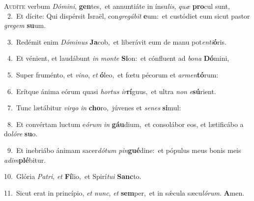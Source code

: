 \lettrine{\initial\textcolor{\initialcolor}{A}}{udíte} verbum \textit{Dó}\-\textit{mi}\textit{ni}, \textbf{gen}\-tes,~\star et annuntiáte in ínsu\-\textit{lis}\-, \textit{quæ} \textbf{pro}\-cul sunt,\\
{\numbfont\textcolor{\numbcolor}{~2.}}~Et dícite: Qui dispérsit Israël, con\-\textit{gre}\-\textit{gá}\textit{bit} \textbf{e}\-um:~\star et custódiet eum sicut pastor \textit{gre}\-\textit{gem} \textbf{su}\-um.\par
{\numbfont\textcolor{\numbcolor}{~3.}}~Redémit enim \textit{Dó}\-\textit{mi}\textit{nus} \textbf{Ja}\-cob,~\star et liberávit eum de manu pot\-\textit{en}\-\textit{ti}\textbf{ó}ris.\par
{\numbfont\textcolor{\numbcolor}{~4.}}~Et vénient, et laudábunt \textit{in} \textit{mon}\-\textit{te} \textbf{Si}\-on:~\star et cónfluent ad \textit{bo}\-\textit{na} \textbf{Dó}\-mini,\par
{\numbfont\textcolor{\numbcolor}{~5.}}~Super fruménto, et \textit{vi}\-\textit{no}, \textit{et} \textbf{ó}\-leo,~\star et fœtu pécorum et \textit{ar}\-\textit{men}\textbf{tó}rum:\par
{\numbfont\textcolor{\numbcolor}{~6.}}~Erítque ánima eórum quasi \textit{hor}\-\textit{tus} \textit{ir}\-\textbf{rí}guus,~\star et ultra \textit{non} \textit{e}\-\textbf{sú}rient.\par
{\numbfont\textcolor{\numbcolor}{~7.}}~Tunc lætábitur \textit{vir}\-\textit{go} \textit{in} \textbf{cho}\-ro,~\star júvenes et \textit{se}\-\textit{nes} \textbf{si}\-mul:\par
{\numbfont\textcolor{\numbcolor}{~8.}}~Et convértam luctum e\-\textit{ó}\-\textit{rum} \textit{in} \textbf{gáu}\-dium,~\star et consolábor eos, et lætificábo a do\-\textit{ló}\-\textit{re} \textbf{su}\-o.\par
{\numbfont\textcolor{\numbcolor}{~9.}}~Et inebriábo ánimam sacer\-\textit{dó}\-\textit{tum} \textit{pin}\-\textbf{gué}dine:~\star et pópulus meus bonis meis \textit{ad}\-\textit{im}\textbf{plé}bitur.\par
{\numbfont\textcolor{\numbcolor}{10.}}~Glória \textit{Pa}\-\textit{tri}, \textit{et} \textbf{Fí}\-lio,~\star et Spirí\-\textit{tu}\-\textit{i} \textbf{Sanc}\-to.\par
{\numbfont\textcolor{\numbcolor}{11.}}~Sicut erat in princípio, \textit{et} \textit{nunc}\-, \textit{et} \textbf{sem}\-per,~\star et in sǽcula sæcu\-\textit{ló}\-\textit{rum}. \textbf{A}\-men.\par
